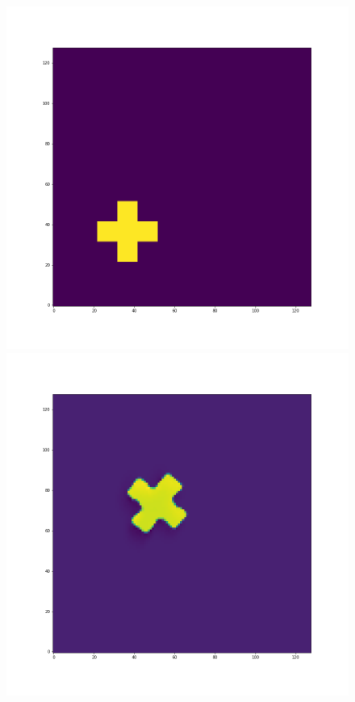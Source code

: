 \documentclass[12pt,a4paper]{article}
\begin{document}
\begin{figure}[H]
\centering
\begin{minipage}{.3\textwidth}
  \centering
  \includegraphics[width=\linewidth]{Pictures/PlusRotateTestJR/PlusRotateTest_t0.png}
\end{minipage}%
\begin{minipage}{.3\textwidth}
  \centering
  \includegraphics[width=\linewidth]{Pictures/PlusRotateTestJR/PlusRotateTest_t10.png}

\end{minipage}
\end{figure}
\end{document}

